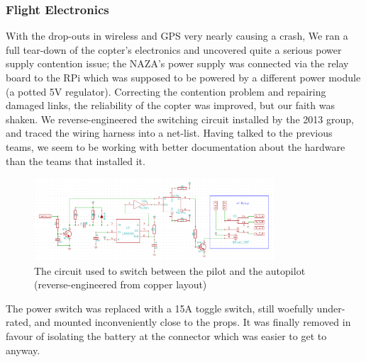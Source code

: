 \documentclass[a4paper, 11pt, titlepage]{article}
\begin{document}
    \subsubsection{Flight Electronics}
      With the drop-outs in wireless and GPS very nearly causing a crash, We ran a full tear-down of the copter's electronics and uncovered quite a serious power supply contention issue; the NAZA's power supply was connected via the relay board to the RPi which was supposed to be powered by a different power module (a potted 5V regulator).  Correcting the contention problem and repairing damaged links, the reliability of the copter was improved, but our faith was shaken.  
      We reverse-engineered the switching circuit installed by the 2013 group, and traced the wiring harness into a net-list.  Having talked to the previous teams, we seem to be working with better documentation about the hardware than the teams that installed it.
      \begin{figure}[h!]
        \centering
        \includegraphics[width=0.8\textwidth]{SwitchCircuit.png}
        \caption{The circuit used to switch between the pilot and the autopilot (reverse-engineered from copper layout)}
      \end{figure}

      The power switch was replaced with a 15A toggle switch, still woefully under-rated, and mounted inconveniently close to the props.  It was finally removed in favour of isolating the battery at the connector which was easier to get to anyway.
\end{document}
